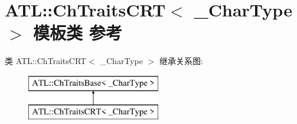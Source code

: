 \hypertarget{class_a_t_l_1_1_ch_traits_c_r_t}{}\section{A\+TL\+:\+:Ch\+Traits\+C\+RT$<$ \+\_\+\+Char\+Type $>$ 模板类 参考}
\label{class_a_t_l_1_1_ch_traits_c_r_t}
类 A\+TL\+:\+:Ch\+Traits\+C\+RT$<$ \+\_\+\+Char\+Type $>$ 继承关系图\+:\begin{figure}[H]
\begin{center}
\leavevmode
\includegraphics[height=2.000000cm]{class_a_t_l_1_1_ch_traits_c_r_t}
\end{center}
\end{figure}
